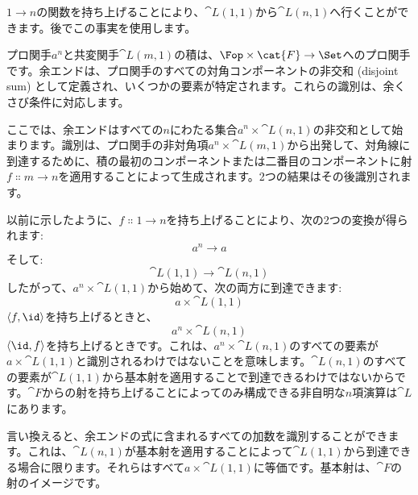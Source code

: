\begin{figure}[H]
  \centering
\end{figure}

$1 \to n$の関数を持ち上げることにより、$\cat{L}(1, 1)$から$\cat{L}(n, 1)$へ行くことができます。後でこの事実を使用します。

プロ関手$a^n$と共変関手$\cat{L}(m, 1)$の積は、$\Fop \times \cat{F} \to \Set$へのプロ関手です。余エンドは、プロ関手のすべての対角コンポーネントの非交和 (disjoint sum) として定義され、いくつかの要素が特定されます。これらの識別は、余くさび条件に対応します。

ここでは、余エンドはすべての$n$にわたる集合$a^n \times \cat{L}(n, 1)$の非交和として始まります。識別は、プロ関手の非対角項$a^n \times \cat{L}(m, 1)$から出発して、対角線に到達するために、積の最初のコンポーネントまたは二番目のコンポーネントに射$f \Colon m \to n$を適用することによって生成されます。2つの結果はその後識別されます。

\begin{figure}[H]
  \centering
\end{figure}

以前に示したように、$f \Colon 1 \to n$を持ち上げることにより、次の2つの変換が得られます: 
\[a^n \to a\]
そして: 
\[\cat{L}(1, 1) \to \cat{L}(n, 1)\]
したがって、$a^n \times \cat{L}(1, 1)$から始めて、次の両方に到達できます: 
\[a \times \cat{L}(1, 1)\]
$\langle f, \id \rangle$を持ち上げるときと、
\[a^n \times \cat{L}(n, 1)\]
$\langle \id, f \rangle$を持ち上げるときです。これは、$a^n \times \cat{L}(n, 1)$のすべての要素が$a \times \cat{L}(1, 1)$と識別されるわけではないことを意味します。$\cat{L}(n, 1)$のすべての要素が$\cat{L}(1, 1)$から基本射を適用することで到達できるわけではないからです。$\cat{F}$からの射を持ち上げることによってのみ構成できる非自明な$n$項演算は$\cat{L}$にあります。

言い換えると、余エンドの式に含まれるすべての加数を識別することができます。これは、$\cat{L}(n, 1)$が基本射を適用することによって$\cat{L}(1, 1)$から到達できる場合に限ります。それらはすべて$a \times \cat{L}(1, 1)$に等価です。基本射は、$\cat{F}$の射のイメージです。

